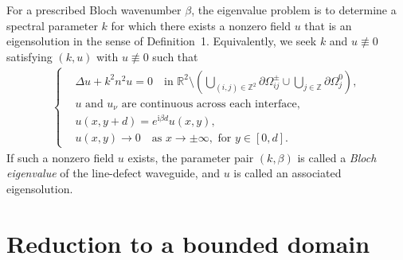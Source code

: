 \documentclass[11pt,fleqn]{article}
\newcommand{\ii}{\mathrm{i}}
\theoremstyle{definition}
\theoremstyle{remark}
\begin{document}
For a prescribed Bloch wavenumber $\beta$, the eigenvalue problem is to
determine a spectral parameter $k$ for which there exists a nonzero field
$u$ that is an eigensolution in the sense of Definition~1. Equivalently,
we seek $k$ and $u\not\equiv 0$ satisfying
$(k,u)$ with $u \not\equiv 0$ such that
\begin{align}
  \begin{cases}
  &\Delta u + k^2 n^2 u = 0
    \quad \text{in } \mathbb{R}^2 \setminus
    \left(
      \bigcup_{(i,j) \in \mathbb{Z}^2} \partial\Omega^\pm_{ij}
      \cup
      \bigcup_{j \in \mathbb{Z}} \partial\Omega^0_j
    \right),\\
  &u \text{ and } u_\nu \text{ are continuous across each interface},\\
  &u(x,y+d)=e^{\ii\beta d}u(x,y),\\
  &u(x,y)\to 0 \quad \text{as } x\to\pm\infty,
    \text{ for } y\in[0,d].
  \end{cases}
  \label{eq:original-eigenvalue-problem}
\end{align}
If such a nonzero field $u$ exists, the parameter pair $(k,\beta)$ is
called a \emph{Bloch eigenvalue} of the line-defect waveguide, and $u$ is called
an associated eigensolution.

\section{Reduction to a bounded domain}
\end{document}
